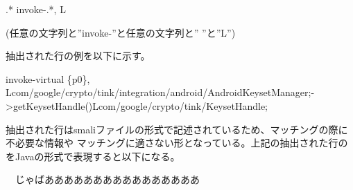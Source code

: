 \begin{center} .* invoke-.*, L \end{center}
(任意の文字列と''invoke-''と任意の文字列と'' ''と''L'')

抽出された行の例を以下に示す。

\begin{center} invoke-virtual \{p0\}, Lcom/google/crypto/tink/integration/android/AndroidKeysetManager;->getKeysetHandle()Lcom/google/crypto/tink/KeysetHandle;\end{center}

抽出された行はsmaliファイルの形式で記述されているため、マッチングの際に不必要な情報や
マッチングに適さない形となっている。上記の抽出された行のをJavaの形式で表現すると以下になる。

\begin{center}　じゃばああああああああああああああああ\end{center}






































